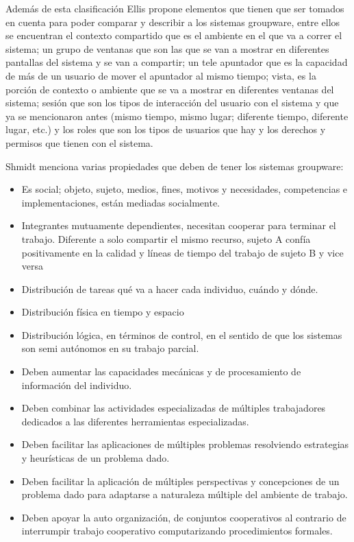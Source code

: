 Adem\'as de esta clasificaci\'on Ellis\cite{ellis1991groupware} propone elementos que tienen que ser tomados en cuenta para poder comparar y describir a los sistemas groupware, entre ellos se encuentran el contexto compartido que es el ambiente en el que va a correr el sistema; un grupo de ventanas que son las que se van a mostrar en diferentes pantallas del sistema y se van a compartir; un tele apuntador que es la capacidad de m\'as de un usuario de mover el apuntador al mismo tiempo; vista, es la porci\'on de contexto o ambiente que se va a mostrar en diferentes ventanas del sistema; sesi\'on que son los tipos de interacci\'on del usuario con el sistema y que ya se mencionaron antes (mismo tiempo, mismo lugar; diferente tiempo, diferente lugar, etc.) y los roles que son los tipos de usuarios que hay y los derechos y permisos que tienen con el sistema.

Shmidt \cite{schmidt1992taking} menciona varias propiedades que deben de tener los sistemas groupware:
\begin{itemize}
\item Es social; objeto, sujeto, medios, fines, motivos y necesidades, competencias e implementaciones, est\'an mediadas socialmente.
\item Integrantes mutuamente dependientes, necesitan cooperar para terminar el trabajo. Diferente a solo compartir el mismo recurso, sujeto A conf\'ia positivamente en la calidad y l\'ineas de tiempo del trabajo de sujeto B y vice versa
\item Distribuci\'on de tareas qu\'e va a hacer cada individuo, cu\'ando y d\'onde.
\item Distribuci\'on f\'isica en tiempo y espacio
\item Distribuci\'on l\'ogica, en t\'erminos de control, en el sentido de que los sistemas son semi aut\'onomos en su trabajo parcial.
\item Deben aumentar las capacidades mec\'anicas y de procesamiento de informaci\'on del individuo.
\item Deben combinar las actividades especializadas de m\'ultiples trabajadores dedicados a las diferentes herramientas especializadas.
\item Deben facilitar las aplicaciones de m\'ultiples problemas resolviendo estrategias y heur\'isticas de un problema dado.
\item Deben facilitar la aplicaci\'on de m\'ultiples perspectivas y concepciones de un problema dado para adaptarse a naturaleza m\'ultiple del ambiente de trabajo.
\item Deben apoyar la auto organizaci\'on, de conjuntos cooperativos al contrario de interrumpir trabajo cooperativo computarizando procedimientos formales.
\end{itemize}

